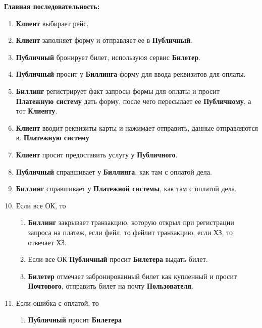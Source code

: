 \textbf{Главная последовательность:} 
\begin{enumerate}
      \item \textbf{Клиент} выбирает рейс.
      \item \textbf{Клиент} заполняет форму и отправляет ее
            в \textbf{Публичный}.
      \item \textbf{Публичный} бронирует билет, используюя
            сервис \textbf{Билетер}.
      \item \textbf{Публичный} просит у \textbf{Биллинга}
            форму для ввода реквизитов для оплаты.
      \item \textbf{Биллинг} регистрирует факт запросы формы
            для оплаты и просит \textbf{Платежную систему}
            дать форму, после чего пересылает ее
            \textbf{Публичному}, а тот \textbf{Клиенту}.
      \item \textbf{Клиент} вводит реквизиты карты и нажимает
            отправить, данные отправляются в.
            \textbf{Платежную систему}
      \item \textbf{Клиент} просит предоставить услугу у
            \textbf{Публичного}.
      \item \textbf{Публичный} справшивает у \textbf{Биллинга},
            как там с оплатой дела.
      \item \textbf{Биллинг} справшивает у \textbf{Платежной системы},
            как там с оплатой дела.
      \item Если все ОК, то
            \begin{enumerate}
                  \item \textbf{Биллинг} закрывает транзакцию, которую
                        открыл при регистрации запроса на платеж,
                        если фейл, то фейлит транзакцию, если ХЗ,
                        то отвечает ХЗ.
                  \item Если все ОК \textbf{Публичный} просит
                        \textbf{Билетера} выдать билет.
                  \item \textbf{Билетер} отмечает забронированный
                        билет как купленный и просит \textbf{Почтового},
                        отправить билет на почту \textbf{Пользователя}.
            \end{enumerate}
      \item Если ошибка с оплатой, то
            \begin{enumerate}
                  \item \textbf{Публичный} просит \textbf{Билетера}

\end{enumerate}
\end{enumerate}
